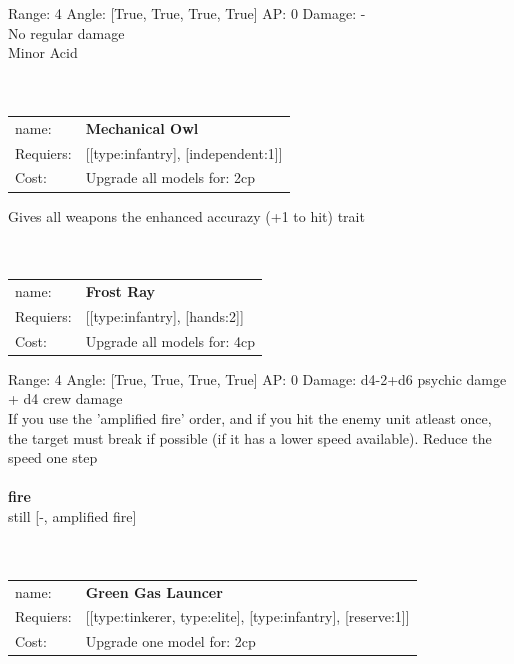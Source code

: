 Range: 4  Angle: [True, True, True, True] AP: 0 Damage: - \\
No regular damage\\ 
Minor Acid\\ 








\ \\
\ \\
\begin{tabular}{ll}
name: & {\bf Mechanical Owl } \\
Requiers: & [[type:infantry], [independent:1]] \\
Cost: & Upgrade all models for: 2cp \\
\end{tabular}

Gives all weapons the enhanced accurazy (+1 to hit) trait\\ 









\ \\
\ \\
\begin{tabular}{ll}
name: & {\bf Frost Ray } \\
Requiers: & [[type:infantry], [hands:2]] \\
Cost: & Upgrade all models for: 4cp \\
\end{tabular}



Range: 4  Angle: [True, True, True, True] AP: 0 Damage: d4-2+d6 psychic damge + d4 crew damage \\
If you use the 'amplified fire' order, and if you hit the enemy unit atleast once, the target must break if possible (if it has a lower speed available). Reduce the speed one step\\ 







\ \\ {\bf fire } \\
still [-, amplified fire] \\

\ \\
\ \\
\begin{tabular}{ll}
name: & {\bf Green Gas Launcer } \\
Requiers: & [[type:tinkerer, type:elite], [type:infantry], [reserve:1]] \\
Cost: & Upgrade one model for: 2cp \\
\end{tabular}



